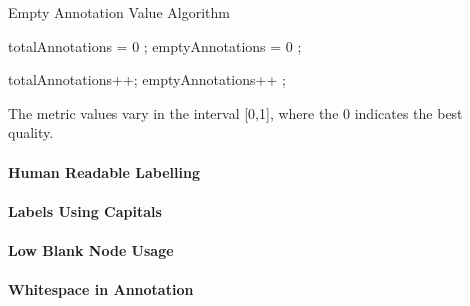 \begin{algorithm}
\caption{Empty Annotation Value Algorithm}\label{lst:emptyAnnotationValue}
\begin{algorithmic}[1]
\State totalAnnotations = 0 ;
\State emptyAnnotations = 0 ;
\EndProcedure

 totalAnnotations++; \EndIf
{} emptyAnnotations++ ; \EndIf
{}
\EndProcedure
\end{algorithmic}
\end{algorithm}


The metric values vary in the interval [0,1], where  the 0 indicates the best quality.


\paragraph{Human Readable Labelling}
\paragraph{Labels Using Capitals}
\paragraph{Low Blank Node Usage}
\paragraph{Whitespace in Annotation}




